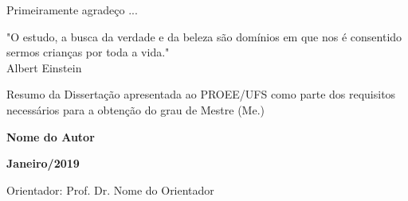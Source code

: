 \documentclass[
	    12pt,				%
	    openright,			%
	    oneside,			%
	    a4paper,			%
	english,			%
	french,				%
	spanish,			%
	brazil,				%
	]{abntex2}
\begin{document}

    \begin{agradecimentos}

    Primeiramente agradeço ...


    \end{agradecimentos}




    \begin{epigrafe}
        \vspace*{\fill}
	    \begin{flushright}
	    "O estudo, a busca da verdade e da beleza são domínios em que nos é consentido sermos crianças por toda a vida."\\
	    \vspace*{0.5cm}
                                                Albert Einstein
	    \end{flushright}
    \end{epigrafe}


    \noindent Resumo da Dissertação apresentada ao PROEE/UFS como parte dos requisitos necessários para a obtenção do grau de Mestre (Me.)

    \begin{center}
        \par
        \vspace*{0.15cm}
        \par
        \textbf{\imprimirtitulo}
        \par
        \vspace*{0.15cm}
        \par
        \textbf{Nome do Autor}
        \vspace*{0.15cm}
        \par
        \textbf{Janeiro/2019}
        \vspace*{0.15cm}
    \end{center}
        \par
    \noindent Orientador: Prof. Dr. Nome do Orientador
        \par
    \vspace*{0.15cm}
        \par
\end{document}
